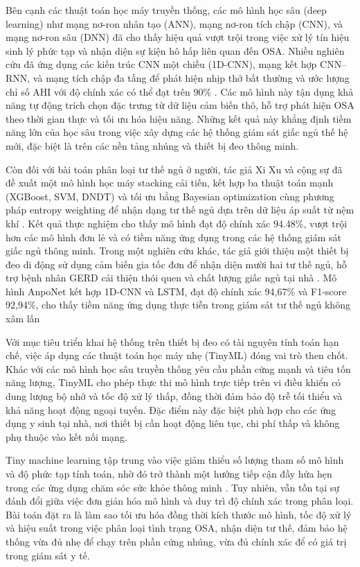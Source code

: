 Bên cạnh các thuật toán học máy truyền thống, các mô hình học sâu (deep
learning) như mạng nơ-ron nhân tạo (ANN), mạng nơ-ron tích chập (CNN), và mạng
nơ-ron sâu (DNN) đã cho thấy hiệu quả vượt trội trong việc xử lý tín hiệu sinh
lý phức tạp và nhận diện sự kiện hô hấp liên quan đến OSA. Nhiều nghiên cứu đã
ứng dụng các kiến trúc CNN một chiều (1D-CNN), mạng kết hợp CNN–RNN, và mạng
tích chập đa tầng để phát hiện nhịp thở bất thường và ước lượng chỉ số AHI với
độ chính xác có thể đạt trên 90\%
\cite{HOANG2025116309,Sleep_Posture_Detection}. Các mô hình này tận dụng khả
năng tự động trích chọn đặc trưng từ dữ liệu cảm biến thô, hỗ trợ phát hiện OSA
theo thời gian thực và tối ưu hóa hiệu năng. Những kết quả này khẳng định tiềm
năng lớn của học sâu trong việc xây dựng các hệ thống giám sát giấc ngủ thế hệ
mới, đặc biệt là trên các nền tảng nhúng và thiết bị đeo thông minh.

Còn đối với bài toán phân loại tư thế ngủ ở người, tác giả Xi Xu và cộng sự đã
đề xuất một mô hình học máy stacking cải tiến, kết hợp ba thuật toán mạnh
(XGBoost, SVM, DNDT) và tối ưu bằng Bayesian optimization cùng phương pháp
entropy weighting để nhận dạng tư thế ngủ dựa trên dữ liệu áp suất từ nệm khí
\cite{xu2024classification}. Kết quả thực nghiệm cho thấy mô hình đạt độ chính
xác 94.48\%, vượt trội hơn các mô hình đơn lẻ và có tiềm năng ứng dụng trong
các hệ thống giám sát giấc ngủ thông minh. Trong một nghiên cứu khác, tác giả
giới thiệu một thiết bị đeo di động sử dụng cảm biến gia tốc đơn để nhận diện
mười hai tư thế ngủ, hỗ trợ bệnh nhân GERD cải thiện thói quen và chất lượng
giấc ngủ tại nhà \cite{Vu2025SleepPosition}. Mô hình AnpoNet kết hợp 1D-CNN và
LSTM, đạt độ chính xác 94,67\% và F1-score 92,94\%, cho thấy tiềm năng ứng dụng
thực tiễn trong giám sát tư thế ngủ không xâm lấn

Với mục tiêu triển khai hệ thống trên thiết bị đeo có tài nguyên tính toán hạn
chế, việc áp dụng các thuật toán học máy nhẹ (TinyML) đóng vai trò then chốt.
Khác với các mô hình học sâu truyền thống yêu cầu phần cứng mạnh và tiêu tốn
năng lượng, TinyML cho phép thực thi mô hình trực tiếp trên vi điều khiển có
dung lượng bộ nhớ và tốc độ xử lý thấp, đồng thời đảm bảo độ trễ tối thiểu và
khả năng hoạt động ngoại tuyến. Đặc điểm này đặc biệt phù hợp cho các ứng dụng
y sinh tại nhà, nơi thiết bị cần hoạt động liên tục, chi phí thấp và không phụ
thuộc vào kết nối mạng.

Tiny machine learning tập trung vào việc giảm thiểu số lượng tham số mô hình và
độ phức tạp tính toán, nhờ đó trở thành một hướng tiếp cận đầy hứa hẹn trong
các ứng dụng chăm sóc sức khỏe thông minh
\cite{ray2021tinyml,diab2022embedded}. Tuy nhiên, vẫn tồn tại sự đánh đổi giữa
việc đơn giản hóa mô hình và duy trì độ chính xác trong phân loại. Bài toán đặt
ra là làm sao tối ưu hóa đồng thời kích thước mô hình, tốc độ xử lý và hiệu
suất trong việc phân loại tình trạng OSA, nhận diện tư thế, đảm bảo hệ thống
vừa đủ nhẹ để chạy trên phần cứng nhúng, vừa đủ chính xác để có giá trị trong
giám sát y tế.

